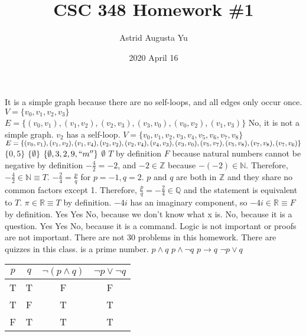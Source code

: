 \documentclass{article}
\author{Astrid Augusta Yu}
\title{CSC 348 Homework \#1}
\date{2020 April 16}
\begin{document}
\maketitle
\begin{outline}[enumerate]
    \1 
        \2 It is a simple graph because there are no self-loops, and all edges only occur once.
        \2 
            $V = \{ v_0, v_1, v_2, v_3 \}$ \\
            $E = \{ (v_0, v_1), (v_1, v_2), (v_2, v_3), (v_3, v_0), (v_0, v_2), (v_1, v_3)\}$
    \1 
        \2 No, it is not a simple graph. $v_2$ has a self-loop.
        \2 
            $V = \{ v_0, v_1, v_2, v_3, v_4, v_5, v_6, v_7, v_8 \}$ \\
            $E = \{(v_0, v_1), (v_1, v_2), (v_1, v_4), (v_2, v_2), (v_2, v_4), (v_4, v_3), (v_3, v_0), \\ (v_5, v_7), (v_5, v_8), (v_7, v_8), (v_7, v_6) \}$
    \1  
        \2 $\{ 0, 5 \}$
        \2 $\{ \emptyset \}$
        \2 $\{ \emptyset, 3, 2, 9, `` m '' \}$
        \2 $\emptyset$
    \1 
        \2 $T$ by definition
        \2 $F$ because natural numbers cannot be negative by definition
        \2 $-\frac{4}{2} = -2$, and $-2 \in \mathbb{Z}$ because $-(-2) \in \mathbb{N}$. Therefore, $-\frac{4}{2} \in \mathbb{N} \equiv T$.
        \2 $-\frac{2}{4} = \frac{p}{q}$ for $p=-1, q=2$. $p$ and $q$ are both in $\mathbb{Z}$ and they share no common factors except 1. Therefore, $\frac{p}{q} = -\frac{2}{4} \in \mathbb{Q}$ and the statement is equivalent to $T$.
        \2 $\pi \in \mathbb{R} \equiv T$ by definition.
        \2 $-4i$ has an imaginary component, so $-4i \in \mathbb{R} \equiv F$ by definition.
    \1
        \2 Yes
        \2 Yes
        \2 No, because we don't know what x is.
        \2 No, because it is a question.
        \2 Yes
        \2 Yes
        \2 No, because it is a command.
    \1 
        \2 Logic is not important or proofs are not important.
        \2 There are not 30 problems in this homework.
        \2 There are quizzes in this class.
         is a prime number.
    \1
        \2 $p \wedge q$
        \2 $p \wedge \neg q$
        \2 $p \rightarrow q$
        \2 $\neg p \vee q$
    \1
        \2 \begin{tabular}{c | c | c | c}
            $p$ & $q$ & $\neg (p \wedge q)$ & $\neg p \vee \neg q$  \\
            \hline
            T & T & F & F \\
            T & F & T & T \\
            F & T & T & T \\

\end{tabular}
\end{outline}
\end{document}
